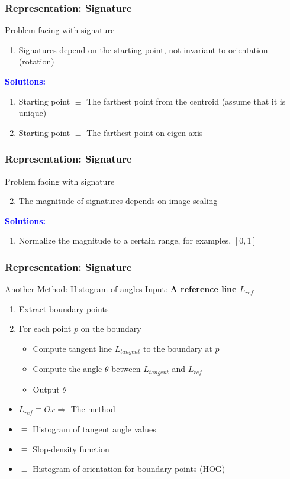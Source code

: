 \documentclass[english,11pt,table,handout]{beamer}
\begin{document}
\frame
{
	\frametitle{Representation: Signature}
	
	\begin{block}{Problem facing with signature}
		\begin{enumerate}
			\item Signatures depend on the starting point, not invariant to orientation (rotation)
		\end{enumerate}
		\textbf{\textcolor{blue}{Solutions:}}
		\begin{enumerate}
			\item Starting point $\equiv$ The farthest point from the centroid (assume that it is unique)
			\item Starting point $\equiv$ The farthest point on eigen-axis
		\end{enumerate}
	\end{block}
}
\frame
{
	\frametitle{Representation: Signature}
	
	\begin{block}{Problem facing with signature}
		\begin{enumerate}
			\setcounter{enumi}{1}
			\item The magnitude of signatures depends on image scaling
		\end{enumerate}
		\textbf{\textcolor{blue}{Solutions:}}
		\begin{enumerate}
			\item Normalize the magnitude to a certain range, for examples, $[0, 1]$
		\end{enumerate}
	\end{block}
}

\frame
{
	\frametitle{Representation: Signature}
	\large
	\begin{block}{Another Method: Histogram of angles}
		Input: \textbf{A reference line $L_{ref}$}
		\begin{enumerate}
			\item Extract boundary points
			\item For each point  $p$ on the boundary
			\begin{itemize}
				\item Compute tangent line $L_{tangent}$ to the boundary at $p$
				\item Compute the angle $\theta$ between $L_{tangent}$ and $L_{ref}$ 
				\item Output  $\theta$ 
			\end{itemize}
		\end{enumerate}
	\end{block}
	\begin{itemize}
		\item $L_{ref} \equiv Ox \Rightarrow$ The method 
		\item $\equiv$ Histogram of tangent angle values 
		\item $\equiv$ Slop-density function
		\item $\equiv$ Histogram of orientation for boundary points (HOG)
	\end{itemize}
}
\end{document}
